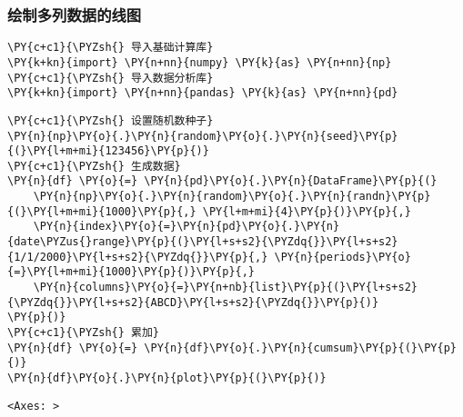     \hypertarget{ux7ed8ux5236ux591aux5217ux6570ux636eux7684ux7ebfux56fe}{%
\subsubsection{绘制多列数据的线图}\label{ux7ed8ux5236ux591aux5217ux6570ux636eux7684ux7ebfux56fe}}

    \begin{tcolorbox}[breakable, size=fbox, boxrule=1pt, pad at break*=1mm,colback=cellbackground, colframe=cellborder]
\begin{Verbatim}[commandchars=\\\{\}]
\PY{c+c1}{\PYZsh{} 导入基础计算库}
\PY{k+kn}{import} \PY{n+nn}{numpy} \PY{k}{as} \PY{n+nn}{np}
\PY{c+c1}{\PYZsh{} 导入数据分析库}
\PY{k+kn}{import} \PY{n+nn}{pandas} \PY{k}{as} \PY{n+nn}{pd}
\end{Verbatim}
\end{tcolorbox}

    \begin{tcolorbox}[breakable, size=fbox, boxrule=1pt, pad at break*=1mm,colback=cellbackground, colframe=cellborder]
\begin{Verbatim}[commandchars=\\\{\}]
\PY{c+c1}{\PYZsh{} 设置随机数种子}
\PY{n}{np}\PY{o}{.}\PY{n}{random}\PY{o}{.}\PY{n}{seed}\PY{p}{(}\PY{l+m+mi}{123456}\PY{p}{)}
\PY{c+c1}{\PYZsh{} 生成数据}
\PY{n}{df} \PY{o}{=} \PY{n}{pd}\PY{o}{.}\PY{n}{DataFrame}\PY{p}{(}
    \PY{n}{np}\PY{o}{.}\PY{n}{random}\PY{o}{.}\PY{n}{randn}\PY{p}{(}\PY{l+m+mi}{1000}\PY{p}{,} \PY{l+m+mi}{4}\PY{p}{)}\PY{p}{,} 
    \PY{n}{index}\PY{o}{=}\PY{n}{pd}\PY{o}{.}\PY{n}{date\PYZus{}range}\PY{p}{(}\PY{l+s+s2}{\PYZdq{}}\PY{l+s+s2}{1/1/2000}\PY{l+s+s2}{\PYZdq{}}\PY{p}{,} \PY{n}{periods}\PY{o}{=}\PY{l+m+mi}{1000}\PY{p}{)}\PY{p}{,}
    \PY{n}{columns}\PY{o}{=}\PY{n+nb}{list}\PY{p}{(}\PY{l+s+s2}{\PYZdq{}}\PY{l+s+s2}{ABCD}\PY{l+s+s2}{\PYZdq{}}\PY{p}{)}
\PY{p}{)}
\PY{c+c1}{\PYZsh{} 累加}
\PY{n}{df} \PY{o}{=} \PY{n}{df}\PY{o}{.}\PY{n}{cumsum}\PY{p}{(}\PY{p}{)}
\PY{n}{df}\PY{o}{.}\PY{n}{plot}\PY{p}{(}\PY{p}{)}
\end{Verbatim}
\end{tcolorbox}

            \begin{tcolorbox}[breakable, size=fbox, boxrule=.5pt, pad at break*=1mm, opacityfill=0]
\begin{Verbatim}[commandchars=\\\{\}]
<Axes: >
\end{Verbatim}
\end{tcolorbox}
        
    \begin{center}
    \end{center}
    { \hspace*{\fill} \\}
